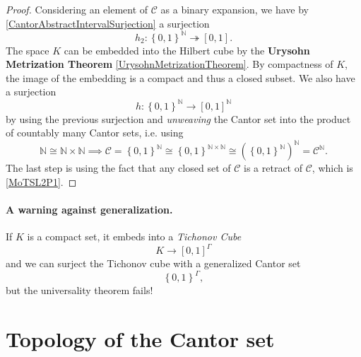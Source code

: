 \begin{proof}
    Considering an element of \( \mathcal{C} \) as a binary expansion, we have by \ref{CantorAbstractIntervalSurjection} a surjection
\[ 
    h_2: \left\{ 0,1 \right\}^{ \mathbb{N} } \twoheadrightarrow [0,1] .
\]
The space \( K \) can be embedded into the Hilbert cube by the \textbf{Urysohn Metrization Theorem} \ref{UrysohnMetrizationTheorem}. By compactness of \( K \), the image of the embedding is a compact and thus a closed subset. We also have a surjection
\[ 
    h: \left\{ 0,1 \right\}^{ \mathbb{N} } \to [0,1]^{ \mathbb{N} }
\]
by using the previous surjection and \emph{unweaving} the Cantor set into the product of countably many Cantor sets, i.e. using
\[ 
    \mathbb{N} \cong \mathbb{N} \times \mathbb{N} \implies \mathcal{C} =  \left\{ 0,1 \right\}^\mathbb{N} \cong \left\{ 0,1 \right\}^{ \mathbb{N} \times \mathbb{N} } \cong \left( \left\{ 0,1 \right\}^{ \mathbb{N} } \right)^{ \mathbb{N} } = \mathcal{C}^{ \mathbb{N} }.
\]
The last step is using the fact that any closed set of \( \mathcal{C} \) is a retract of \( \mathcal{C} \), which is \ref{MoTSL2P1}.
\end{proof}

\paragraph{A warning against generalization.} If \( K \) is a compact set, it embeds into a \emph{Tichonov Cube}
\[ 
    K \to [0,1]^\Gamma 
\]
and we can surject the Tichonov cube with a generalized Cantor set
\[ 
    \left\{ 0,1 \right\}^{\Gamma},
\]
but the universality theorem fails!

\section{Topology of the Cantor set}



